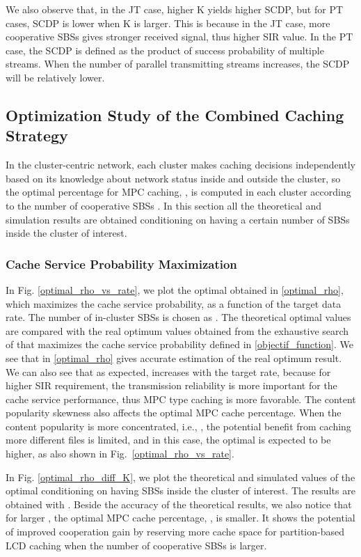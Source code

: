\documentclass[twocolumns,10pt]{IEEEtran}
\begin{document}
We also observe that, in the JT case,  higher K yields higher SCDP, but for PT cases, SCDP is lower when K is larger. This is because in the JT case, more cooperative SBSs gives stronger received signal, thus higher SIR value. In the PT case, the SCDP is defined as the product of success probability of multiple streams. When the number of parallel transmitting streams increases, the SCDP will be relatively lower.  

\subsection{Optimization Study of the Combined Caching Strategy}
In the cluster-centric network,  each cluster makes caching decisions independently based on its knowledge about network status inside and outside the cluster, so the optimal percentage  for MPC caching, , is computed in each cluster according to the number of cooperative SBSs .
In this section all the theoretical and simulation results are obtained conditioning on having a certain number  of SBSs inside the cluster of interest.
 
\subsubsection{Cache Service Probability Maximization}
In Fig. \ref{optimal_rho_vs_rate}, we plot the optimal  obtained in \eqref{optimal_rho}, which maximizes the cache service probability, as a function of the target data rate. The number of in-cluster SBSs is chosen as . 
The theoretical optimal values are compared with the real optimum values obtained from the exhaustive search of  that maximizes the cache service probability defined in \eqref{objectif_function}. 
We see that  in \eqref{optimal_rho} gives accurate estimation of the real optimum result. We can also see that as expected,  increases with the target rate, because for higher SIR requirement, the transmission reliability is more important for the cache service performance, thus MPC type caching is more favorable. 
The content popularity skewness also affects the optimal MPC cache percentage. When the content popularity is more concentrated, i.e., , the potential benefit from caching more different files is limited, and in this case, the optimal  is expected to be higher, as also shown in Fig.~\ref{optimal_rho_vs_rate}.

In Fig. \ref{optimal_rho_diff_K}, we plot the theoretical and simulated values of the optimal   conditioning on having  SBSs inside the cluster of interest. The results are obtained with . Beside the accuracy of the theoretical results, we also notice that for larger , the optimal MPC cache percentage, , is smaller. It shows the potential of improved cooperation gain by reserving more cache space for partition-based LCD caching when the number of cooperative SBSs is larger. 
\end{document}
